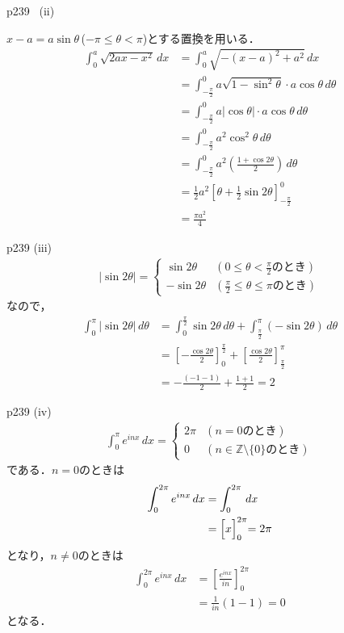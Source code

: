 \documentclass[dvipdfmx,uplatex,11pt]{jsarticle}
\theoremstyle{definition}
\begin{document}
\begin{screen}
	p239 \, (ii) \par
	  $x-a=a \sin \theta$\,($ -\pi \le \theta < \pi$)とする置換を用いる．
	\begin{align*}
		\int_{0}^{a} \sqrt{2ax-x^2} \, dx & = \int_{0}^{a} \sqrt{-(x-a)^2+a^2} \, dx \\
		& = \int_{-\frac{\pi}{2}}^{0} a \sqrt{1-\sin ^2 \theta } \cdot a\cos \theta \, d \theta \\
		& = \int_{-\frac{\pi}{2}}^{0} a |\cos \theta| \cdot a\cos \theta \, d \theta \\
		& = \int_{-\frac{\pi}{2}}^{0} a^2 \cos^2 \theta \, d \theta \\
		& = \int_{-\frac{\pi}{2}}^{0} a^2 \left (\frac{1+\cos 2 \theta }{2}\right) \, d \theta \\
		& = \frac{1}{2} a^2 \left [\theta + \frac{1}{2}\sin 2 \theta \right ]_{-\frac{\pi}{2}}^{0} \\
		&= \frac{\pi a^2}{4}
	\end{align*}
\end{screen}

\begin{screen}
	p239 (iii) 
	\begin{align*}
		|\sin 2 \theta| =
		\begin{cases}
			\sin 2 \theta & (0 \le \theta < \frac{\pi}{2} のとき)\\
			- \sin 2 \theta & (\frac{\pi}{2}\le \theta \le \pi のとき)
		\end{cases}
	\end{align*}
		なので，
		\begin{align*}
			\int_{0}^{\pi} |\sin 2 \theta| \, d \theta & = \int_{0}^{\frac{\pi}{2}} \sin 2 \theta \, d \theta +\int_{\frac{\pi}{2}}^{\pi} (-\sin 2 \theta) \, d \theta \\
			&= \left [-\frac{\cos 2 \theta}{2}\right]_{0}^{\frac{\pi}{2}} + \left [\frac{\cos 2 \theta}{2}\right]_{\frac{\pi}{2}}^{\pi} \\
			& = -\frac{(-1-1)}{2} + \frac{1+1}{2} = 2
		\end{align*}
	\end{screen}

	\begin{screen}
		p239 (iv) 
		\begin{align*}
			\int_{0}^{\pi} e^{inx} \, dx  =
			\begin{cases}
				2 \pi & (n=0 のとき) \\
				0 & (n \in \mathbb{Z}\setminus \{0\} のとき)
			\end{cases}
		\end{align*}
		である．$n=0$のときは
		\begin{align*}
			\int_{0}^{2 \pi} e^{inx} \, dx & = \int_{0}^{2\pi} \, dx \\
			& = \Bigl[x\Bigl]_{0}^{2\pi} = 2\pi
		\end{align*}
		となり，$n \ne 0$のときは
		\begin{align*}
			\int_{0}^{2\pi} e^{inx} \, dx & = \left [\frac{e^{inx}}{in} \right ]_{0}^{2\pi} \\
			& = \frac{1}{in} (1-1)=0
		\end{align*}
		となる．
	\end{screen}
\end{document}
